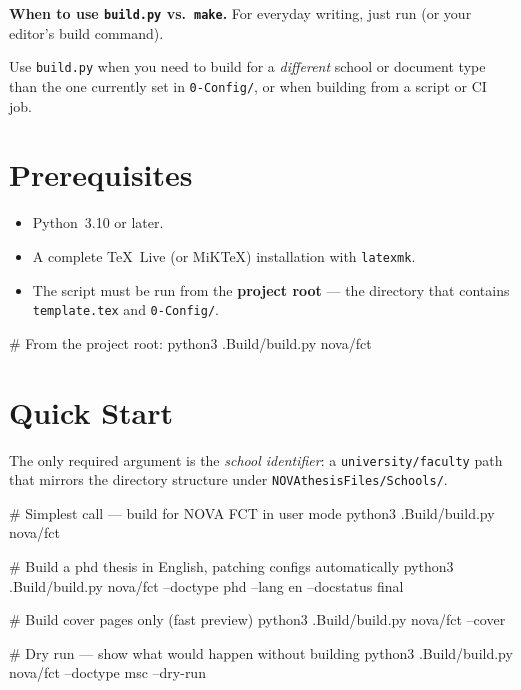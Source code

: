   \medskip\noindent
  \textbf{When to use \texttt{build.py} vs.\ \texttt{make}.}  For everyday
  writing, just run  (or your editor's build command).

Use \texttt{build.py} when you need to build for a \emph{different} school
or document type than the one currently set in \verb!0-Config/!, or when
building from a script or CI job.


\section{Prerequisites}
\label{sec:buildpy_prereqs}

\begin{itemize}
  \item Python~3.10 or later.
  \item A complete \TeX~Live (or MiK\TeX) installation with \texttt{latexmk}.
  \item The script must be run from the \textbf{project root} — the directory
        that contains \verb!template.tex! and \verb!0-Config/!.
\end{itemize}

\begin{bashcode}
# From the project root:
python3 .Build/build.py nova/fct
\end{bashcode}


\section{Quick Start}
\label{sec:buildpy_quickstart}

The only required argument is the \emph{school identifier}: a
\verb!university/faculty! path that mirrors the directory structure under
\verb!NOVAthesisFiles/Schools/!.

\begin{bashcode}
# Simplest call — build for NOVA FCT in user mode
python3 .Build/build.py nova/fct

# Build a \gls{phd} thesis in English, patching configs automatically
python3 .Build/build.py nova/fct --doctype phd --lang en --docstatus final

# Build cover pages only (fast preview)
python3 .Build/build.py nova/fct --cover

# Dry run — show what would happen without building
python3 .Build/build.py nova/fct --doctype msc --dry-run
\end{bashcode}

